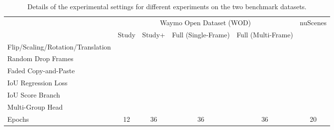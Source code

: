 \documentclass[10pt,twocolumn,letterpaper]{article}
\begin{document}
\begin{table*}[t]
\centering
\begin{tabular}{|l|cccc|c|}
\hline
\multirow{2}{*}{}                   & \multicolumn{4}{c|}{Waymo Open Dataset (WOD)}                                                                                                        & \multirow{2}{*}{nuScenes} \\ \cline{2-5}
                                    & \multicolumn{1}{l}{Study} & \multicolumn{1}{l}{Study+} & \multicolumn{1}{l}{Full (Single-Frame)} & Full (Multi-Frame) &                           \\ \hline    
Flip/Scaling/Rotation/Translation &             &       &      &            &           \\ 
Random Drop Frames   &     &      &      &              &          \\ 
Faded Copy-and-Paste  &          &         &         &          &               \\  \hdashline
IoU Regression Loss  &           &             &    &      &       \\ 
IoU Score Branch     &           &              &       &          &                \\ Multi-Group Head & &  &  &  &  \\ \hdashline
Epochs   & 12        & 36         & 36               &   36       &     20       \\ \hline
\end{tabular}
\vspace{-2mm}
\caption{Details of the experimental settings for different experiments on the two benchmark datasets.}
\label{tab:aug}
\end{table*}








 
\end{document}
